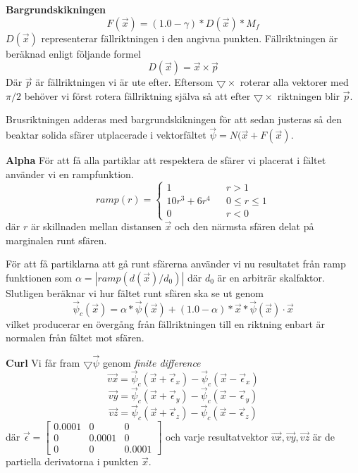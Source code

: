 \documentclass[a4paper]{article}
\begin{document}
\textbf{Bargrundskikningen}
\begin{equation}
    F(\vec{x}) = (1.0-\gamma) * D(\vec{x}) * M_f
\end{equation}
$D(\vec{x})$ representerar fällriktningen i den angivna punkten. Fällriktningen är beräknad enligt följande formel
\begin{equation}
   D(\vec{x}) = \vec{x} \times \vec{p}
\end{equation}
Där $\vec{p}$ är fällriktningen vi är ute efter. Eftersom $\bigtriangledown \times$ roterar alla vektorer med $\pi/2$ behöver vi först rotera fällriktning själva så att efter $\bigtriangledown \times$ riktningen blir $\vec{p}$.

Brusriktningen adderas med bargrundskikningen för att sedan justeras så den beaktar solida sfärer utplacerade i vektorfältet $\vec{\psi} = N(\vec{x} + F(\vec{x})$.

\textbf{Alpha}
För att få alla partiklar att respektera de sfärer vi placerat i fältet använder vi en rampfunktion.
\begin{equation}
ramp(r) = \left\{\begin{matrix}
1  && r > 1
\\
10r^3 + 6r^4 && 0 \le r \le 1
\\ 
0  && r < 0
\end{matrix}\right.
\end{equation}
där $r$ är skillnaden mellan distansen $\vec{x}$ och den närmsta sfären delat på marginalen runt sfären. 

För att få partiklarna att gå runt sfärerna använder vi nu resultatet från ramp funktionen som $\alpha = | ramp(d(\vec{x})/d_0) |$ där $d_0$  är en arbiträr skalfaktor. Slutligen beräknar vi hur fältet runt sfären ska se ut genom 
\begin{equation}
\vec{\psi}_c(\vec{x}) = \alpha * \vec{\psi}(\vec{x}) + (1.0 - \alpha) * \vec{x} * \vec{\psi}(\vec{x}) \cdot \vec{x}
\end{equation}
vilket producerar en övergång från fällriktningen till en riktning enbart är normalen från fältet mot sfären.

\textbf{Curl}
Vi får fram $\bigtriangledown \vec{\psi}$ genom \textit{finite difference}
\begin{equation}
\vec{vx} = \vec{\psi}_c(\vec{x} + \vec{\epsilon}_x  ) - \vec{\psi}_c(\vec{x} - \vec{\epsilon}_x  )
\end{equation}
\begin{equation}
\vec{vy} = \vec{\psi}_c(\vec{x} + \vec{\epsilon}_y  ) - \vec{\psi}_c(\vec{x} - \vec{\epsilon}_y  )
\end{equation}
\begin{equation}
\vec{vz} = \vec{\psi}_c(\vec{x} + \vec{\epsilon}_z  ) - \vec{\psi}_c(\vec{x} - \vec{\epsilon}_z  )
\end{equation}
där $\vec{\epsilon} = \begin{bmatrix}
0.0001 & 0 & 0\\ 
0 & 0.0001 & 0\\ 
0 & 0 & 0.0001
\end{bmatrix}$ och varje resultatvektor $\vec{vx},\vec{vy},\vec{vz}$ är de partiella derivatorna i punkten $\vec{x}$.
\end{document}
